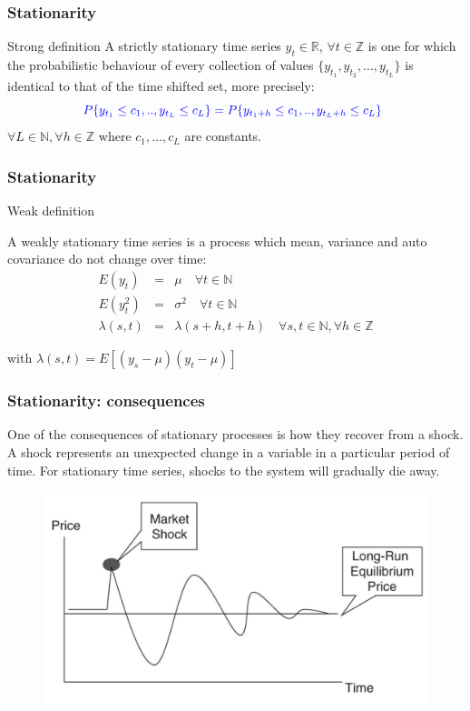 \documentclass{beamer}
\begin{document}
\begin{frame}
\frametitle{Stationarity}
\begin{block}{Strong definition}
A {\color{red}strictly stationary time series} $y_t \in \mathbb{R}$, $\forall t \in \mathbb{Z}$ is one for which the probabilistic behaviour of every collection of values $\{y_{t_1},y_{t_2},\dots,y_{t_L}\}$ is identical
to that of the time shifted set, more precisely:
\begin{equation*}
{\color{blue}
P\{y_{t_1} \leq
c_1,..,y_{t_L} \leq c_L\} = P\{y_{t_1+h} \leq c_1,..,y_{t_L+h} \leq c_L\}\enspace }
\end{equation*}
\noindent $\forall L \in \mathbb{N}, \forall h \in \mathbb{Z}$ where $c_1,\dots,c_L$ are constants.
\end{block}
\end{frame}

\begin{frame}
\frametitle{Stationarity}
\begin{block}{Weak definition}

A weakly stationary time series is a process which mean, variance and auto covariance do not change over time:
\small
{\color{blue}
 \begin{eqnarray*} E(y_t) &=& \mu  \quad
\forall t \in \mathbb{N} \\ E(y^2_t) &=& \sigma^2  \quad \forall t \in
\mathbb{N} \\ \lambda(s,t)&=&\lambda(s+h,t+h) \quad \forall s,t \in \mathbb{N},
\forall h \in \mathbb{Z} \end{eqnarray*}}
\end{block}
\noindent with $\lambda(s,t) = E[(y_s-\mu)(y_t - \mu)]$ 
\end{frame}

\begin{frame}
\frametitle{Stationarity: consequences}
One of the consequences of stationary processes is how they recover from a shock. A shock represents an unexpected change in a variable in a particular period of time. For stationary time series, shocks to the system will gradually die away. 
\begin{figure}
\includegraphics[width=0.6\paperwidth]{img/shock}
\end{figure}
\end{frame}
\end{document}
